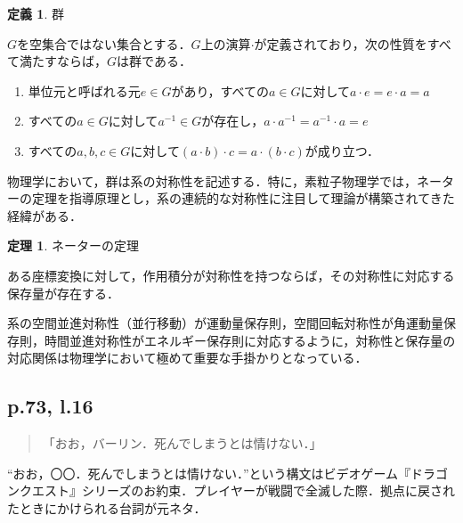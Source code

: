 \documentclass[10pt, a5paper, twoside]{jsarticle}
\theoremstyle{definition}
\newtheorem{dfn}{定義}
\newtheorem{thm}{定理}
\begin{document}
			\begin{dfn}

				群

				$G$を空集合ではない集合とする．$G$上の演算$\cdot$が定義されており，次の性質をすべて満たすならば，$G$は群である．

				\begin{enumerate}
					
					\item 単位元と呼ばれる元$e \in G$があり，すべての$a \in G$に対して$a \cdot e = e \cdot a = a$

					\item すべての$a \in G$に対して$a^{-1} \in G$が存在し，$a \cdot a^{-1} = a^{-1} \cdot a = e$

					\item すべての$a, b, c \in G$に対して$(a \cdot b) \cdot c = a \cdot (b \cdot c)$が成り立つ．

				\end{enumerate}
				
			\end{dfn}

			物理学において，群は系の対称性を記述する．特に，素粒子物理学では，ネーターの定理を指導原理とし，系の連続的な対称性に注目して理論が構築されてきた経緯がある．

			\begin{thm}

				ネーターの定理

				ある座標変換に対して，作用積分が対称性を持つならば，その対称性に対応する保存量が存在する．
				
			\end{thm}

			系の空間並進対称性（並行移動）が運動量保存則，空間回転対称性が角運動量保存則，時間並進対称性がエネルギー保存則に対応するように，対称性と保存量の対応関係は物理学において極めて重要な手掛かりとなっている．

		\subsection{p.73, l.16}

			\begin{quote}

				「おお，バーリン．死んでしまうとは情けない．」
				
			\end{quote}

			“おお，〇〇．死んでしまうとは情けない．”という構文はビデオゲーム『ドラゴンクエスト』シリーズのお約束．プレイヤーが戦闘で全滅した際．拠点に戻されたときにかけられる台詞が元ネタ．
\end{document}
